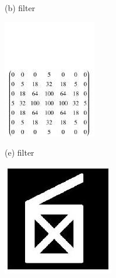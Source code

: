 \documentclass[10pt]{article}
\begin{document}
(b) filter

\includegraphics[max width=\textwidth]{2022_01_06_b5ce182ed1bd5f482e5bg-20(3)}

(e) filter

\includegraphics[max width=\textwidth]{2022_01_06_b5ce182ed1bd5f482e5bg-20(4)}
\end{document}
